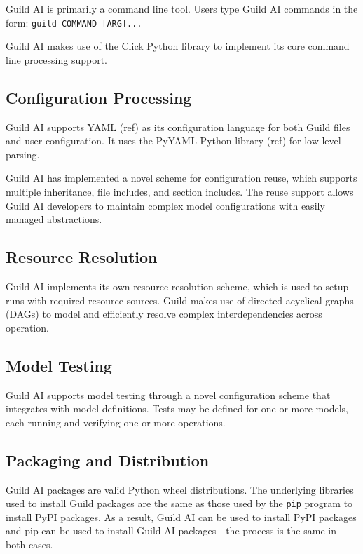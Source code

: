 \documentclass{article}
\begin{document}
Guild AI is primarily a command line tool. Users type Guild AI
commands in the form: \verb|guild COMMAND [ARG]...|

Guild AI makes use of the Click Python library \cite{click} to
implement its core command line processing support.

\subsection{Configuration Processing}

Guild AI supports YAML (ref) as its configuration language for both
Guild files and user configuration. It uses the PyYAML Python library
(ref) for low level parsing.

Guild AI has implemented a novel scheme for configuration reuse, which
supports multiple inheritance, file includes, and section
includes. The reuse support allows Guild AI developers to maintain
complex model configurations with easily managed abstractions.

\subsection{Resource Resolution}

Guild AI implements its own resource resolution scheme, which is used
to setup runs with required resource sources. Guild makes use of
directed acyclical graphs (DAGs) to model and efficiently resolve
complex interdependencies across operation.

\subsection{Model Testing}

Guild AI supports model testing through a novel configuration scheme
that integrates with model definitions. Tests may be defined for one
or more models, each running and verifying one or more operations.

\subsection{Packaging and Distribution}

Guild AI packages are valid Python wheel distributions. The underlying
libraries used to install Guild packages are the same as those used by
the \verb|pip| program to install PyPI packages. As a result, Guild
AI can be used to install PyPI packages and pip can be used to install
Guild AI packages---the process is the same in both cases.
\end{document}
